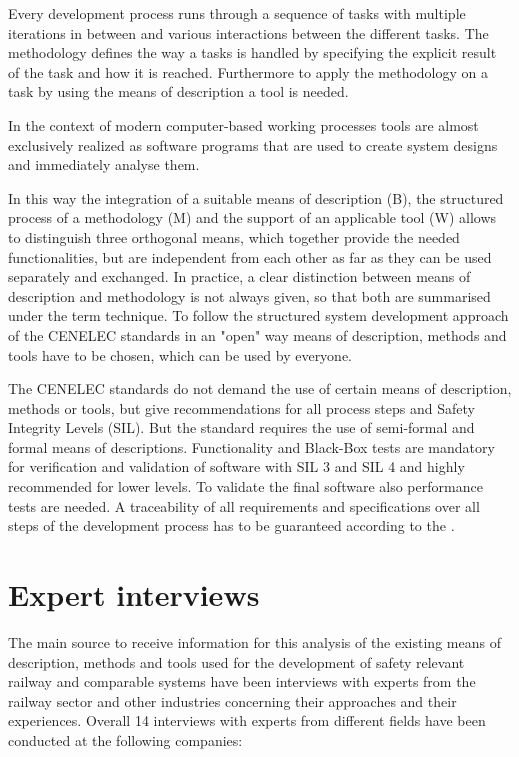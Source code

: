 \documentclass{./template/openetcs_report}
\begin{document}
 Every development process runs through a sequence of tasks with multiple iterations in between and various interactions between the different tasks. The methodology defines the way a tasks is handled by specifying the explicit result of the task and how it is reached. Furthermore to apply the methodology on a task by using the means of description a tool is needed. 

In the context of modern computer-based working processes tools are almost exclusively realized as software programs that are used to create system designs and immediately analyse them. 

In this way the integration of a suitable means of description (B),  the structured process of a methodology (M) and the support of an applicable tool (W) allows to distinguish three orthogonal means, which together provide the needed functionalities, but are independent from each other as far as they can be used separately and exchanged. In practice, a clear distinction between means of description and methodology is not always given, so that both are summarised under the term technique. To follow the structured system development approach of the CENELEC standards in an "open" way means of description, methods and tools have to be chosen, which can be used by everyone. 

The CENELEC standards do not demand the use of certain means of description, methods or tools, but give recommendations for all process steps and Safety Integrity Levels (SIL). But the standard requires the use of semi-formal and formal means of descriptions. Functionality and Black-Box tests are mandatory for verification and validation of software with SIL 3 and SIL 4 and highly recommended for lower levels. To validate the final software also performance tests are needed. A traceability of all requirements and specifications over all steps of the development process has to be guaranteed according to the \citeauthor{EN50128:2011}. 

\chapter{Expert interviews}

The main source to receive information for this analysis of the existing means of description, methods and tools used for the  development of safety relevant railway and comparable systems have been interviews with experts from the railway sector and other  industries concerning their approaches and their experiences. Overall 14 interviews  with experts from different fields have been conducted  at the following companies:
\end{document}
